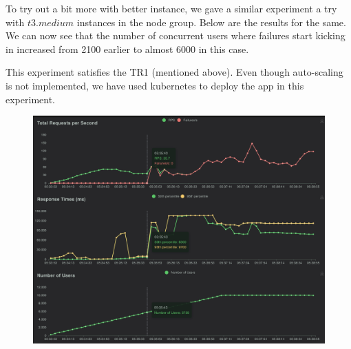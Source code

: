 \documentclass{article}
\begin{document}
To try out a bit more with better instance, we gave a similar experiment a try with $t3.medium$ instances in the node group. Below are the results for the same. We can now see that the number of concurrent users where failures start kicking in increased from 2100 earlier to almost 6000 in this case. 

This experiment satisfies the TR1 (mentioned above). Even though auto-scaling is not implemented, we have used kubernetes to deploy the app in this experiment. 
\begin{figure}[H]
    \centering
    \includegraphics[width=0.9\linewidth]{images/exp_1_2_results.png}
\end{figure}
\newpage
\end{document}

